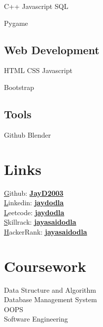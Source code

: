 \documentclass[14pt]{deedy-resume-openfont}
\begin{document}
\begin{minipage}[t]{0.33\textwidth}
    C++ \textbullet{} Javascript \textbullet{} SQL
    \sectionsep

    Pygame
    \sectionsep

    \subsection{Web Development}
    HTML \textbullet{} CSS \textbullet{} Javascript 

    Bootstrap
    \sectionsep

    \subsection{Tools}
    Github \textbullet{} Blender
    \sectionsep

    \section{Links}

    \href{https://github.com/JayD2003}
    Github: \href{https://github.com/JayD2003}{\bf JayD2003} \\

    \href{https://www.linkedin.com/in/jaydodla}
    Linkedin: \href{https://www.linkedin.com/in/jaydodla}{\bf jaydodla} \\

    \href{https://leetcode.com/jaydodla}
    Leetcode: \href{https://leetcode.com/jaydodla}{\bf jaydodla} \\

    \href{https://www.skillrack.com/faces/resume.xhtml?id=354895&key=58446aebcd454f84fa66b66db75eec3a178e138a}
    Skillrack: \href{https://www.skillrack.com/faces/resume.xhtml?id=354895&key=58446aebcd454f84fa66b66db75eec3a178e138a}{\bf jayasaidodla} \\
    
    \href{https://www.hackerrank.com/profile/jayasaidodla}
    HackerRank: \href{https://www.hackerrank.com/profile/jayasaidodla}{\bf jayasaidodla} \\
    \sectionsep

    \section{Coursework}
    \textbullet{} Data Structure and Algorithm \\
    \textbullet{} Database Management System \\
    \textbullet{} OOPS \\
    \textbullet{} Software Engineering
    \sectionsep


\end{minipage}
\end{document}
